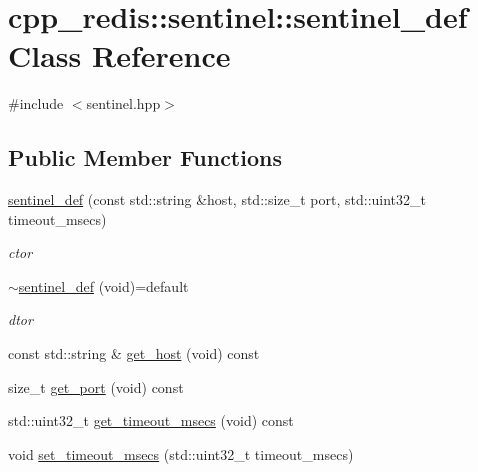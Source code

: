 \hypertarget{classcpp__redis_1_1sentinel_1_1sentinel__def}{}\section{cpp\+\_\+redis\+:\+:sentinel\+:\+:sentinel\+\_\+def Class Reference}
\label{classcpp__redis_1_1sentinel_1_1sentinel__def}


{\ttfamily \#include $<$sentinel.\+hpp$>$}

\subsection*{Public Member Functions}
\begin{DoxyCompactItemize}
\item 
\mbox{\label{classcpp__redis_1_1sentinel_1_1sentinel__def_a2d3116ce99ba2bd8c320ccc85901e5a1}} 
\hyperlink{classcpp__redis_1_1sentinel_1_1sentinel__def_a2d3116ce99ba2bd8c320ccc85901e5a1}{sentinel\+\_\+def} (const std\+::string \&host, std\+::size\+\_\+t port, std\+::uint32\+\_\+t timeout\+\_\+msecs)
\begin{DoxyCompactList}\small\item\em ctor \end{DoxyCompactList}\item 
\mbox{\label{classcpp__redis_1_1sentinel_1_1sentinel__def_a5189d8016d9b385099e5ee0828ed7666}} 
\hyperlink{classcpp__redis_1_1sentinel_1_1sentinel__def_a5189d8016d9b385099e5ee0828ed7666}{$\sim$sentinel\+\_\+def} (void)=default
\begin{DoxyCompactList}\small\item\em dtor \end{DoxyCompactList}\item 
const std\+::string \& \hyperlink{classcpp__redis_1_1sentinel_1_1sentinel__def_af61b33ea2b5154735e4b804039771f19}{get\+\_\+host} (void) const
\item 
size\+\_\+t \hyperlink{classcpp__redis_1_1sentinel_1_1sentinel__def_a1994bec14cc8703d1198de96b66a0f30}{get\+\_\+port} (void) const
\item 
std\+::uint32\+\_\+t \hyperlink{classcpp__redis_1_1sentinel_1_1sentinel__def_af7aa53bdf7bd56becdad9205e82949c5}{get\+\_\+timeout\+\_\+msecs} (void) const
\item 
void \hyperlink{classcpp__redis_1_1sentinel_1_1sentinel__def_abc234e6c289f7b3d95868ae32343ff92}{set\+\_\+timeout\+\_\+msecs} (std\+::uint32\+\_\+t timeout\+\_\+msecs)
\end{DoxyCompactItemize}


